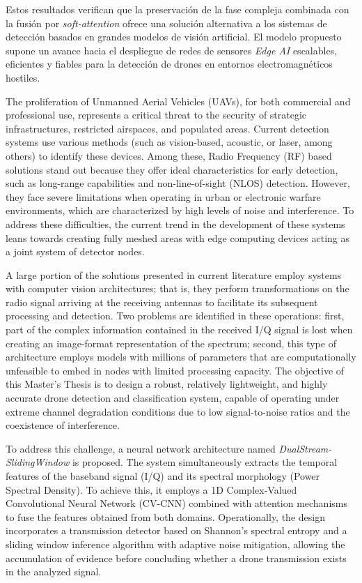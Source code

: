 Estos resultados verifican que la preservación de la fase compleja combinada con la fusión por \textit{soft-attention} ofrece una solución alternativa a los sistemas de detección basados en grandes modelos de visión artificial. El modelo propuesto supone un avance hacia el despliegue de redes de sensores \textit{Edge AI} escalables, eficientes y fiables para la detección de drones en entornos electromagnéticos hostiles.

The proliferation of Unmanned Aerial Vehicles (UAVs), for both commercial and professional use, represents a critical threat to the security of strategic infrastructures, restricted airspaces, and populated areas. Current detection systems use various methods (such as vision-based, acoustic, or laser, among others) to identify these devices. Among these, Radio Frequency (RF) based solutions stand out because they offer ideal characteristics for early detection, such as long-range capabilities and non-line-of-sight (NLOS) detection. However, they face severe limitations when operating in urban or electronic warfare environments, which are characterized by high levels of noise and interference. To address these difficulties, the current trend in the development of these systems leans towards creating fully meshed areas with edge computing devices acting as a joint system of detector nodes.

A large portion of the solutions presented in current literature employ systems with computer vision architectures; that is, they perform transformations on the radio signal arriving at the receiving antennas to facilitate its subsequent processing and detection. Two problems are identified in these operations: first, part of the complex information contained in the received I/Q signal is lost when creating an image-format representation of the spectrum; second, this type of architecture employs models with millions of parameters that are computationally unfeasible to embed in nodes with limited processing capacity. The objective of this Master's Thesis is to design a robust, relatively lightweight, and highly accurate drone detection and classification system, capable of operating under extreme channel degradation conditions due to low signal-to-noise ratios and the coexistence of interference.

To address this challenge, a neural network architecture named \textit{DualStream-SlidingWindow} is proposed. The system simultaneously extracts the temporal features of the baseband signal (I/Q) and its spectral morphology (Power Spectral Density). To achieve this, it employs a 1D Complex-Valued Convolutional Neural Network (CV-CNN) combined with attention mechanisms to fuse the features obtained from both domains. Operationally, the design incorporates a transmission detector based on Shannon's spectral entropy and a sliding window inference algorithm with adaptive noise mitigation, allowing the accumulation of evidence before concluding whether a drone transmission exists in the analyzed signal.

